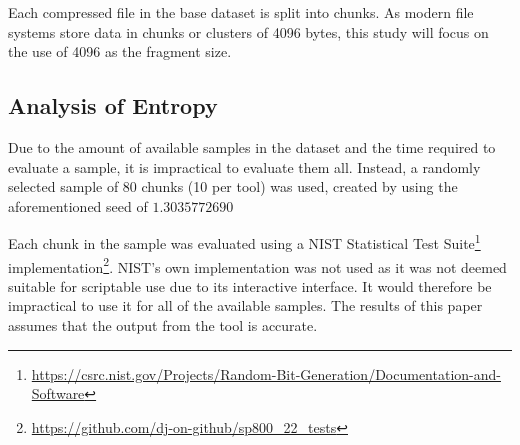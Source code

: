 \documentclass[conference]{IEEEtran}
\begin{document}
Each compressed file in the base dataset is split into chunks. As modern file systems store data in chunks or clusters of 4096 bytes\cite{PENROSE2013}, this study will focus on the use of 4096 as the fragment size.


\subsection{Analysis of Entropy}
\label{method:entropy}

Due to the amount of available samples in the dataset and the time required to evaluate a sample, it is impractical to evaluate them all. Instead, a randomly selected sample of 80 chunks (10 per tool) was used, created by using the aforementioned seed of $1.3035772690$

Each chunk in the sample was evaluated using a NIST Statistical Test Suite\footnote{\href{https://csrc.nist.gov/Projects/Random-Bit-Generation/Documentation-and-Software}{https://csrc.nist.gov/Projects/Random-Bit-Generation/Documentation-and-Software}} implementation\footnote{\href{https://github.com/dj-on-github/sp800_22_tests}{https://github.com/dj-on-github/sp800\_22\_tests}}. NIST's own implementation was not used as it was not deemed suitable for scriptable use due to its interactive interface. It would therefore be impractical to use it for all of the available samples. The results of this paper assumes that the output from the tool is accurate.
\end{document}
